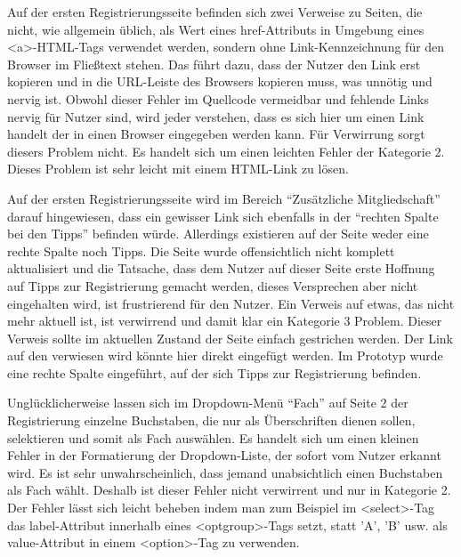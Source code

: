 {Auf der ersten Registrierungsseite befinden sich zwei Verweise zu Seiten, die nicht, wie allgemein üblich, als Wert eines href-Attributs in Umgebung eines <a>-HTML-Tags verwendet werden, sondern ohne Link-Kennzeichnung für den Browser im Fließtext stehen. Das führt dazu, dass der Nutzer den Link erst kopieren und in die URL-Leiste des Browsers kopieren muss, was unnötig und nervig ist.
}
{Obwohl dieser Fehler im Quellcode vermeidbar und fehlende Links nervig für Nutzer sind, wird jeder verstehen, dass es sich hier um einen Link handelt der in einen Browser eingegeben werden kann. Für Verwirrung sorgt diesers Problem nicht. Es handelt sich um einen leichten Fehler der Kategorie 2.
}
{Dieses Problem ist sehr leicht mit einem HTML-Link zu lösen.
} 

{Auf der ersten Registrierungsseite wird im Bereich “Zusätzliche Mitgliedschaft” darauf hingewiesen, dass ein gewisser Link sich ebenfalls in der “rechten Spalte bei den Tipps”  befinden würde. Allerdings existieren auf der Seite weder eine rechte Spalte noch Tipps. Die Seite wurde offensichtlich nicht komplett aktualisiert und die Tatsache, dass dem Nutzer auf dieser Seite erste Hoffnung auf Tipps zur Registrierung gemacht werden, dieses Versprechen aber nicht eingehalten wird, ist frustrierend für den Nutzer.
}
{Ein Verweis auf etwas, das nicht mehr aktuell ist, ist verwirrend und damit klar ein Kategorie 3 Problem.
}
{Dieser Verweis sollte im aktuellen Zustand der Seite einfach gestrichen werden. Der Link auf den verwiesen wird könnte hier direkt eingefügt werden. Im Prototyp wurde eine rechte Spalte eingeführt, auf der sich Tipps zur Registrierung befinden.
} 

{Unglücklicherweise lassen sich im Dropdown-Menü “Fach” auf Seite 2 der Registrierung einzelne Buchstaben, die nur als Überschriften dienen sollen, selektieren und somit als Fach auswählen. 
}
{Es handelt sich um einen kleinen Fehler in der Formatierung der Dropdown-Liste, der sofort vom Nutzer erkannt wird. Es ist sehr unwahrscheinlich, dass jemand unabsichtlich einen Buchstaben als Fach wählt. Deshalb ist dieser Fehler nicht verwirrent und nur in Kategorie 2.
}
{Der Fehler lässt sich leicht beheben indem man zum Beispiel im <select>-Tag das label-Attribut innerhalb eines <optgroup>-Tags setzt, statt 'A', 'B' usw. als value-Attribut in einem <option>-Tag zu verwenden.
} 




